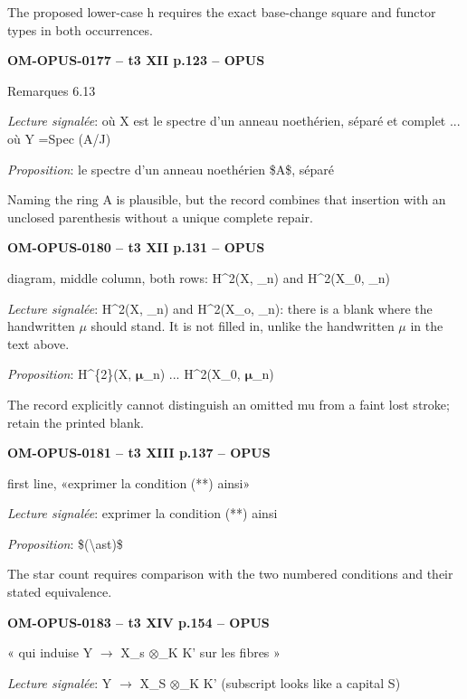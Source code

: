 The proposed lower-case h requires the exact base-change square and functor types in both occurrences.\par
\par\noindent\textbf{OM-OPUS-0177 -- t3 XII p.123 -- OPUS}\par
Remarques 6.13\par
\emph{Lecture signalée}: où X est le spectre d'un anneau noethérien, séparé et complet ... où Y =\allowbreak  Spec (A/J)\par
\emph{Proposition}: le spectre d'un anneau noethérien \$A\$, séparé\par
Naming the ring A is plausible, but the record combines that insertion with an unclosed parenthesis without a unique complete repair.\par
\par\noindent\textbf{OM-OPUS-0180 -- t3 XII p.131 -- OPUS}\par
diagram, middle column, both rows: H\textasciicircum{}2(X, \_n) and H\textasciicircum{}2(X\_0, \_n)\par
\emph{Lecture signalée}: H\textasciicircum{}2(X, \_n) and H\textasciicircum{}2(X\_o, \_n): there is a blank where the handwritten \ensuremath{\mu} should stand. It is not filled in, unlike the handwritten \ensuremath{\mu} in the text above.\par
\emph{Proposition}: H\textasciicircum{}\{2\}(X, \ensuremath{𝛍}\_n) ... H\textasciicircum{}2(X\_0, \ensuremath{𝛍}\_n)\par
The record explicitly cannot distinguish an omitted mu from a faint lost stroke; retain the printed blank.\par
\par\noindent\textbf{OM-OPUS-0181 -- t3 XIII p.137 -- OPUS}\par
first line, «exprimer la condition (**) ainsi»\par
\emph{Lecture signalée}: exprimer la condition (**) ainsi\par
\emph{Proposition}: \$(\textbackslash{}ast)\$\par
The star count requires comparison with the two numbered conditions and their stated equivalence.\par
\par\noindent\textbf{OM-OPUS-0183 -- t3 XIV p.154 -- OPUS}\par
« qui induise Y \ensuremath{\to} X\_s \ensuremath{\otimes}\_K K' sur les fibres »\par
\emph{Lecture signalée}: Y \ensuremath{\longrightarrow} X\_S \ensuremath{\otimes}\_K K' (subscript looks like a capital S)\par
